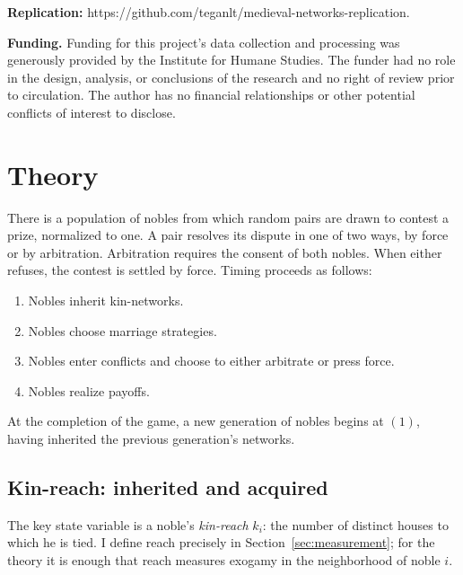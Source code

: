 \documentclass[12pt]{article}
\theoremstyle{definition}
\theoremstyle{remark}
\begin{document}
\vspace{\baselineskip}

\noindent \textbf{Replication:} https://github.com/teganlt/medieval-networks-replication.



\vspace{\baselineskip}

\noindent \textbf{Funding.} Funding for this project's data collection and processing was generously provided by the Institute for Humane Studies. The funder had no role in the design, analysis, or conclusions of the research and no right of review prior to circulation. The author has no financial relationships or other potential conflicts of interest to disclose.


\clearpage



\clearpage

\appendix


\section{Theory}
\label{app:theory}

There is a population of nobles from which random pairs are drawn to contest a prize, normalized to one. A pair resolves its dispute in one of two ways, by force or by arbitration. Arbitration requires the consent of both nobles. When either refuses, the contest is settled by force. Timing proceeds as follows:
\begin{enumerate}
    \item Nobles inherit kin-networks.
    \item Nobles choose marriage strategies.
    \item Nobles enter conflicts and choose to either arbitrate or press force.
    \item Nobles realize payoffs.
\end{enumerate}
At the completion of the game, a new generation of nobles begins at $(1)$, having inherited the previous generation's networks.

\subsection{Kin-reach: inherited and acquired}

The key state variable is a noble's \emph{kin-reach} $k_i$: the number of distinct houses to which he is tied. I define reach precisely in Section~\ref{sec:measurement}; for the theory it is enough that reach measures exogamy in the neighborhood of noble $i$.
\end{document}
